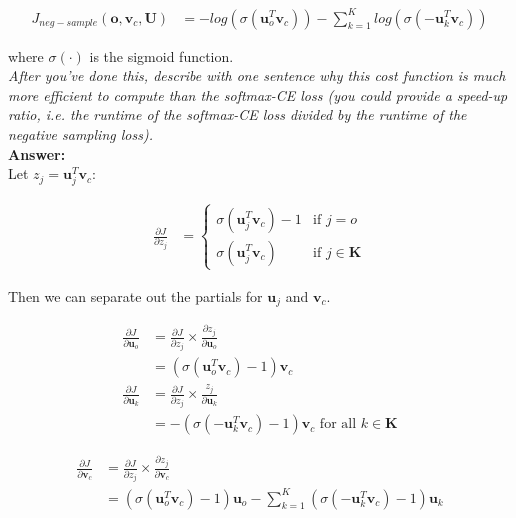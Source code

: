 \documentclass[fleqn]{MJD}
\newcommand{\0}{\emptyset}
\begin{document}
\begin{align}
	J_{neg-sample}(\bm{o}, \bm{v}_{c}, \bm{U}) &= %
		− log(\sigma(\bm{u}_{o}^{T} \bm{v}_{c})) - \sum\limits_{k=1}^{K} log(\sigma(-\bm{u}_{k}^{T} \bm{v}_{c}))
\end{align}

\noindent where $\sigma(\cdot)$ is the sigmoid function. \\

\noindent \textit{After you’ve done this, describe with one sentence why this cost function is much more efficient to compute than the softmax-CE loss (you could provide a speed-up ratio, i.e. the runtime of the softmax-CE loss divided by the runtime of the negative sampling loss).} \\


\noindent \textbf{Answer:} \\

\noindent Let $z_{j} = \bm{u}_{j}^{T} \bm{v}_{c}$:

\begin{align}
	\frac{\partial J}{\partial z_{j}} &= %
		\left\{
			\begin{array}{ll}
				 \sigma(\bm{u}_{j}^{T} \bm{v}_{c}) - 1 & \mbox{if } j = o \\ 
				 \sigma(\bm{u}_{j}^{T} \bm{v}_{c}) 	   & \mbox{if } j \in \bm{K}
			\end{array}
		\right. \nonumber 
\end{align}

\noindent Then we can separate out the partials for $\bm{u}_{j}$ and $\bm{v}_{c}$.

\begin{align}
	\frac{\partial J}{\partial \bm{u}_{o}} &= %
		\frac{\partial J}{\partial z_{j}} \times %
			\frac{ \partial z_{j} }{ \partial \bm{u}_{o} } \nonumber \\
		&= (\sigma(\bm{u}_{o}^{T} \bm{v}_{c}) - 1) \bm{v}_{c} \nonumber \\
	\frac{\partial J}{\partial \bm{u}_{k}} &= %
			\frac{\partial J}{\partial z_{j}} \times %
				\frac{ z_{j} }{ \partial \bm{u}_{k} } \nonumber \\
		&= -(\sigma(-\bm{u}_{k}^{T} \bm{v}_{c}) - 1) \bm{v}_{c} \mbox{  for all } k \in \bm{K} \nonumber
\end{align}

\begin{align}
	\frac{\partial J}{\partial \bm{v}_{c}} &= %
		\frac{\partial J}{\partial z_{j}} \times %
			\frac{ \partial z_{j}}{ \partial \bm{v}_{c} } \nonumber \\
		&= (\sigma(\bm{u}_{o}^{T} \bm{v}_{c}) -1) \bm{u}_{o} - %
			\sum\limits_{k=1}^{K} (\sigma(- \bm{u}_{k}^{T} \bm{v}_{c}) - 1) \bm{u}_{k} \nonumber
\end{align}
\end{document}
